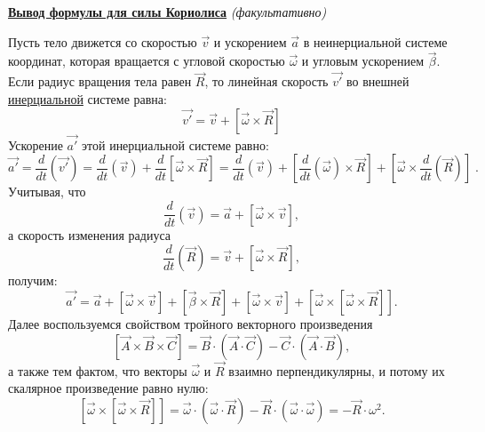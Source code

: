 \documentclass[12pt,epsfig,color,russian]{article}
\begin{document}
\underline{\bf Вывод формулы для силы Кориолиса} \hfill{ } {\color{green}\sl (факультативно)}

Пусть тело движется со скоростью $\vec{v}$ и ускорением $\vec{a}$ в неинерциальной системе координат, которая вращается с угловой скоростью $\vec{\omega}$ и угловым ускорением $\vec{\beta}$. Если радиус вращения тела равен $\vec{R}$,
то линейная скорость $\vec{v\prime}$ во внешней \underline{инерциальной} системе равна:
   \begin{displaymath}
    \vec{v\prime}= \vec{v}+\left[\vec{\omega}\times\vec{R}\right]
   \end{displaymath}
 Ускорение $\vec{a\prime}$ этой инерциальной системе равно:
   \begin{displaymath}
   \vec{a\prime}= \frac{d}{dt}\left(\vec{v\prime}\right) =
   \frac{d}{dt}\left(\vec{v}\right) +
   \frac{d}{dt}\left[\vec{\omega}\times\vec{R}\right]=
   \frac{d}{dt}\left(\vec{v}\right) +
   \left[\frac{d}{dt}\left(\vec{\omega}\right)\times\vec{R}\right] +
   \left[\vec{\omega}\times\frac{d}{dt}\left(\vec{R}\right)\right]\;.
   \end{displaymath}
 Учитывая, что
   \begin{displaymath}
   \frac{d}{dt}\left(\vec{v}\right) = \vec{a}+\left[\vec{\omega}\times\vec{v}\right],
   \end{displaymath}
 а скорость изменения радиуса
   \begin{displaymath}
   \frac{d}{dt}\left(\vec{R}\right) = \vec{v}+\left[\vec{\omega}\times\vec{R}\right],
   \end{displaymath}
получим:
   \begin{displaymath}
   \vec{a\prime}=
   \vec{a}+
   \left[\vec{\omega}\times\vec{v}\right]+
   \left[\vec{\beta}\times\vec{R}\right]+
   \left[\vec{\omega}\times\vec{v}\right]+
   \left[\vec{\omega}\times\left[\vec{\omega}\times\vec{R}\right]\right].
      \end{displaymath}
Далее воспользуемся свойством тройного векторного произведения
   \begin{displaymath}
\left[\vec{A}\times\vec{B}\times\vec{C}\right] =
\vec{B}\cdot\left(\vec{A}\cdot\vec{C}\right) -
\vec{C}\cdot\left(\vec{A}\cdot\vec{B}\right),
      \end{displaymath}
а также тем фактом, что векторы $\vec{\omega}$ и $\vec{R}$ взаимно перпендикулярны, и потому их скалярное произведение равно нулю:
   \begin{displaymath}
   \left[\vec{\omega}\times\left[\vec{\omega}\times\vec{R}\right]\right]=
   \vec{\omega}\cdot\left(\vec{\omega}\cdot\vec{R}\right)-
   \vec{R}\cdot\left(\vec{\omega}\cdot\vec{\omega}\right)=
   -\vec{R}\cdot\omega^2.
   \end{displaymath}
\end{document}
